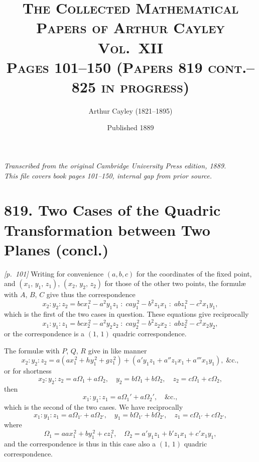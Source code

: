 \documentclass[11pt,a4paper]{article}
\theoremstyle{plain}
\theoremstyle{definition}
\theoremstyle{remark}
\begin{document}
\title{\scshape The Collected Mathematical Papers of Arthur Cayley\\Vol.\ XII\\[0.5em]\large Pages 101--150 (Papers 819 cont.--825 in progress)}
\author{Arthur Cayley (1821--1895)}
\date{Published 1889}
\maketitle

\thispagestyle{empty}
\begin{center}
\textit{Transcribed from the original Cambridge University Press edition, 1889.}\\
\textit{This file covers book pages 101--150, internal gap from prior source.}
\end{center}

\tableofcontents
\newpage

\section*{819. Two Cases of the Quadric Transformation between Two Planes (concl.)}

\noindent\textit{[p.~101]} Writing for convenience $(a, b, c)$ for the coordinates of the fixed point, and $(x_1,\,y_1,\,z_1)$, $(x_2,\,y_2,\,z_2)$ for those of the other two points, the formul\ae{} with $A$, $B$, $C$ give thus the correspondence
\[
x_2 : y_2 : z_2 = bcx_1^{\,2} - a^2y_1z_1 \;:\; ca y_1^{\,2} - b^2 z_1 x_1 \;:\; ab z_1^{\,2} - c^2 x_1 y_1,
\]
which is the first of the two cases in question. These equations give reciprocally
\[
x_1 : y_1 : z_1 = b c x_2^{\,2} - a^2 y_2 z_2 \;:\; c a y_2^{\,2} - b^2 z_2 x_2 \;:\; a b z_2^{\,2} - c^2 x_2 y_2,
\]
or the correspondence is a $(1,\,1)$ quadric correspondence.

The formul\ae{} with $P$, $Q$, $R$ give in like manner
\[
x_2 : y_2 : z_2 = a(a x_1^{\,2} + h y_1^{\,2} + g z_1^{\,2}) + (a' y_1 z_1 + a'' z_1 x_1 + a''' x_1 y_1),\;\&\text{c.},
\]
or for shortness
\[
x_2 : y_2 : z_2 = a\Omega_1 + a\Omega_2,\quad y_2 = b\Omega_1 + b\Omega_2,\quad z_2 = c\Omega_1 + c\Omega_2,
\]
then
\[
x_1 : y_1 : z_1 = a\Omega_1' + a\Omega_2',\quad \&\text{c.},
\]
which is the second of the two cases. We have reciprocally
\[
x_1 : y_1 : z_1 = a\Omega_{1'} + a\Omega_{2'},\quad y_1 = b\Omega_{1'} + b\Omega_{2'},\quad z_1 = c\Omega_{1'} + c\Omega_{2'},
\]
where
\[
\Omega_1 = aa x_1^{\,2} + b y_1^{\,2} + c z_1^{\,2},\quad \Omega_2 = a' y_1 z_1 + b' z_1 x_1 + c' x_1 y_1,
\]
and the correspondence is thus in this case also a $(1,\,1)$ quadric correspondence.
\end{document}
